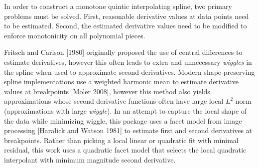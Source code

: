 

In order to construct a monotone quintic interpolating spline, two
primary problems must be solved. First, reasonable derivative values
at data points need to be estimated. Second, the estimated derivative
values need to be modified to enforce monotonicity on all polynomial
pieces.

Fritsch and Carlson [1980] originally proposed the use of central
differences to estimate derivatives, however this often leads to extra
and unnecessary {\it wiggles} in the spline when used to approximate
second derivatives. Modern shape-preserving spline implementations use
a weighted harmonic mean to estimate derivative values at breakpoints
[Moler 2008], however this method also yields approximations whose
second derivative functions often have large local $L^2$ norm
(approximations with large {\it wiggle}). In an attempt to capture the
local shape of the data while minimizing wiggle, this package uses a
facet model from image processing [Haralick and Watson 1981] to
estimate first and second derivatives at breakpoints. Rather than
picking a local linear or quadratic fit with minimal residual, this
work uses a quadratic facet model that selects the local quadratic
interpolant with minimum magnitude second derivative.

